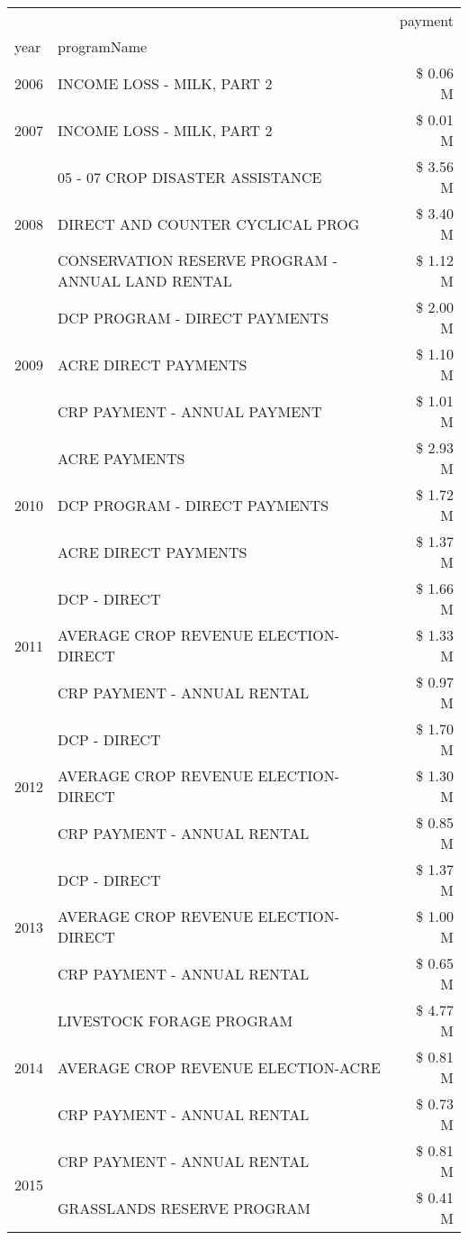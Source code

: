 \begin{tabular}{llr}
\toprule
 &  & payment \\
year & programName &  \\
\midrule
2006 & INCOME LOSS - MILK, PART 2 & \$ 0.06 M \\
\cline{1-3}
2007 & INCOME LOSS - MILK, PART 2 & \$ 0.01 M \\
\cline{1-3}
\multirow[t]{3}{*}{2008} & 05 - 07 CROP DISASTER ASSISTANCE & \$ 3.56 M \\
 & DIRECT AND COUNTER CYCLICAL PROG & \$ 3.40 M \\
 & CONSERVATION RESERVE PROGRAM - ANNUAL LAND RENTAL & \$ 1.12 M \\
\cline{1-3}
\multirow[t]{3}{*}{2009} & DCP PROGRAM - DIRECT PAYMENTS & \$ 2.00 M \\
 & ACRE DIRECT PAYMENTS & \$ 1.10 M \\
 & CRP PAYMENT - ANNUAL PAYMENT & \$ 1.01 M \\
\cline{1-3}
\multirow[t]{3}{*}{2010} & ACRE PAYMENTS & \$ 2.93 M \\
 & DCP PROGRAM - DIRECT PAYMENTS & \$ 1.72 M \\
 & ACRE DIRECT PAYMENTS & \$ 1.37 M \\
\cline{1-3}
\multirow[t]{3}{*}{2011} & DCP - DIRECT & \$ 1.66 M \\
 & AVERAGE CROP REVENUE ELECTION-DIRECT & \$ 1.33 M \\
 & CRP PAYMENT - ANNUAL RENTAL & \$ 0.97 M \\
\cline{1-3}
\multirow[t]{3}{*}{2012} & DCP - DIRECT & \$ 1.70 M \\
 & AVERAGE CROP REVENUE ELECTION-DIRECT & \$ 1.30 M \\
 & CRP PAYMENT - ANNUAL RENTAL & \$ 0.85 M \\
\cline{1-3}
\multirow[t]{3}{*}{2013} & DCP - DIRECT & \$ 1.37 M \\
 & AVERAGE CROP REVENUE ELECTION-DIRECT & \$ 1.00 M \\
 & CRP PAYMENT - ANNUAL RENTAL & \$ 0.65 M \\
\cline{1-3}
\multirow[t]{3}{*}{2014} & LIVESTOCK FORAGE PROGRAM & \$ 4.77 M \\
 & AVERAGE CROP REVENUE ELECTION-ACRE & \$ 0.81 M \\
 & CRP PAYMENT - ANNUAL RENTAL & \$ 0.73 M \\
\cline{1-3}
\multirow[t]{3}{*}{2015} & CRP PAYMENT - ANNUAL RENTAL & \$ 0.81 M \\
 & GRASSLANDS RESERVE PROGRAM & \$ 0.41 M \\

\end{tabular}
